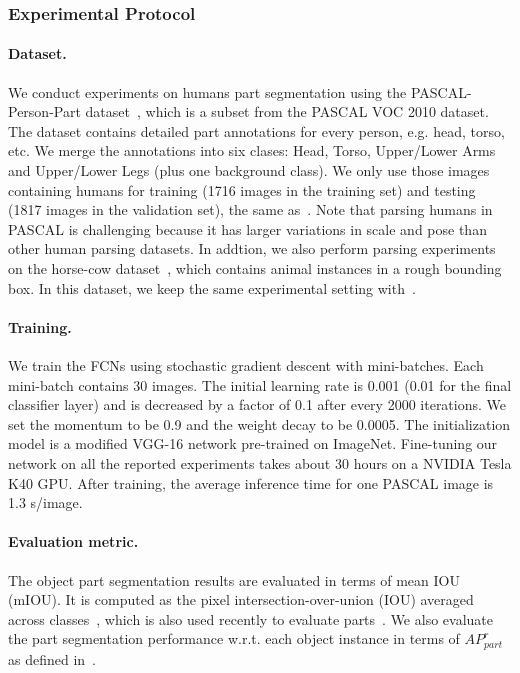 \subsubsection{Experimental Protocol}
\paragraph{\textbf{Dataset.}}
We conduct experiments on humans part segmentation using the PASCAL-Person-Part dataset~\cite{chen2014detect}, which is a subset from the PASCAL VOC 2010 dataset.
The dataset contains detailed part annotations for every person, e.g. head, torso, etc. We merge the annotations into six clases:
Head, Torso, Upper/Lower Arms and Upper/Lower Legs (plus one background class). 
We only use those images containing humans for training (1716 images in the training set) and testing (1817 images in the validation set),
the same as~\cite{chen2016attention}. Note that parsing humans in PASCAL is challenging because it has larger variations in scale and pose than other human parsing datasets. 
In addtion, we also perform parsing experiments on the horse-cow dataset~\cite{wang2015semantic}, which contains animal instances in a rough bounding box.
In this dataset, we keep the same experimental setting with~\cite{wang2015joint}.

\paragraph{\textbf{Training.}}
We train the FCNs using stochastic gradient descent with mini-batches. Each mini-batch contains 30 images.
The initial learning rate is 0.001 (0.01 for the final classifier layer) and is decreased by a factor of 0.1 after every 2000 iterations.
We set the momentum to be 0.9 and the weight decay to be 0.0005. The initialization model is a modified VGG-16 network pre-trained on ImageNet.
Fine-tuning our network on all the reported experiments takes about 30 hours on a NVIDIA Tesla K40 GPU.
After training, the average inference time for one PASCAL image is 1.3 s/image.

\paragraph{\textbf{Evaluation metric.}}
The object part segmentation results are evaluated in terms of mean IOU (mIOU).
It is computed as the pixel intersection-over-union (IOU) averaged across classes~\cite{everingham2014pascal},
which is also used recently to evaluate parts~\cite{wang2015joint,chen2016attention}.
We also evaluate the part segmentation performance w.r.t. each object instance in terms of $AP^r_{part}$ as defined in~\cite{hariharan2015hypercolumns}.

